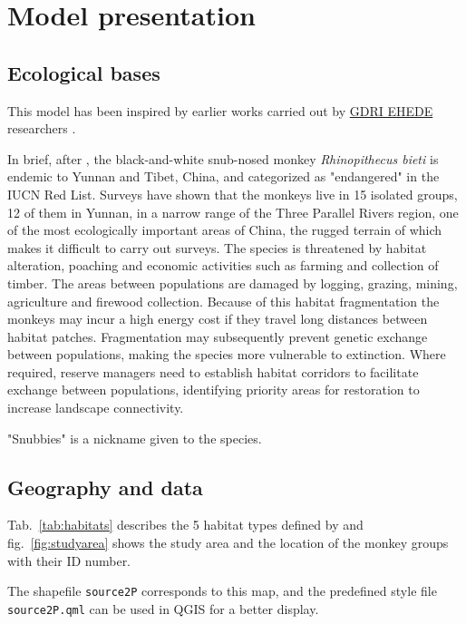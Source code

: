 \chapter{Model presentation}
\label{chap:Model Presentation}


\section{Ecological bases}

This model has been inspired by earlier works carried out by \href{https://gdri-ehede.univ-fcomte.fr}{GDRI EHEDE} researchers \citep{Li2015,Clauzel2015,Li2017}.

In brief, after \citet{Li2015}, the black-and-white snub-nosed monkey \textit{Rhinopithecus bieti} is endemic to Yunnan and Tibet, China, and categorized as "endangered" in the IUCN Red List. Surveys have shown that the monkeys live in 15 isolated groups, 12 of them in Yunnan, in a narrow range of the Three Parallel Rivers region, one of the most ecologically important areas of China, the rugged terrain of which makes it difficult to carry out surveys. The species is threatened by habitat alteration, poaching and economic activities such as farming and collection of timber. The areas between populations are damaged by logging, grazing, mining, agriculture and firewood collection. Because of this habitat fragmentation the monkeys may incur a high energy cost if they travel long distances between habitat patches. Fragmentation may subsequently prevent genetic exchange between populations, making the species more vulnerable to extinction. Where required, reserve managers need to establish habitat corridors to facilitate exchange between populations, identifying priority areas for restoration to increase landscape connectivity.

"Snubbies" is a nickname given to the species.

\section{Geography and data}

 Tab.~\ref{tab:habitats} describes the 5 habitat types defined by \citet{Li2017} and fig.~\ref{fig:studyarea} shows the study area and the location of the monkey groups with their ID number.
 
 The shapefile \texttt{source2P} corresponds to this map, and the predefined style file \texttt{source2P.qml} can be used in QGIS for a better display.
 
